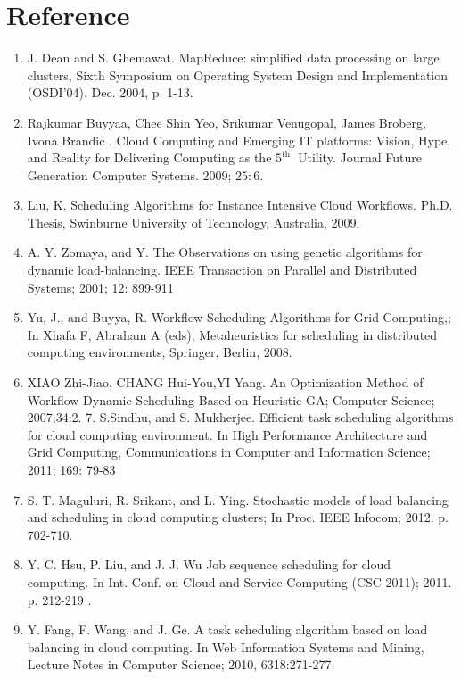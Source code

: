 \documentclass[10pt]{article}
\begin{document}
\section{Reference}
\begin{enumerate}
  \item J. Dean and S. Ghemawat. MapReduce: simplified data processing on large clusters, Sixth Symposium on Operating System Design and Implementation (OSDI'04). Dec. 2004, p. 1-13.

  \item Rajkumar Buyyaa, Chee Shin Yeo, Srikumar Venugopal, James Broberg, Ivona Brandic . Cloud Computing and Emerging IT platforms: Vision, Hype, and Reality for Delivering Computing as the $5^{\text {th }}$ Utility. Journal Future Generation Computer Systems. 2009; $25: 6$.

  \item Liu, K. Scheduling Algorithms for Instance Intensive Cloud Workflows. Ph.D. Thesis, Swinburne University of Technology, Australia, 2009.

  \item A. Y. Zomaya, and Y. The Observations on using genetic algorithms for dynamic load-balancing. IEEE Transaction on Parallel and Distributed Systems; 2001; 12: 899-911

  \item Yu, J., and Buyya, R. Workflow Scheduling Algorithms for Grid Computing,; In Xhafa F, Abraham A (eds), Metaheuristics for scheduling in distributed computing environments, Springer, Berlin, 2008.

  \item XIAO Zhi-Jiao, CHANG Hui-You,YI Yang. An Optimization Method of Workflow Dynamic Scheduling Based on Heuristic GA; Computer Science; 2007;34:2. 7. S.Sindhu, and S. Mukherjee. Efficient task scheduling algorithms for cloud computing environment. In High Performance Architecture and Grid Computing, Communications in Computer and Information Science; 2011; 169: 79-83

  \item S. T. Maguluri, R. Srikant, and L. Ying. Stochastic models of load balancing and scheduling in cloud computing clusters; In Proc. IEEE Infocom; 2012. p. 702-710.

  \item Y. C. Hsu, P. Liu, and J. J. Wu Job sequence scheduling for cloud computing. In Int. Conf. on Cloud and Service Computing (CSC 2011); 2011. p. 212-219 .

  \item Y. Fang, F. Wang, and J. Ge. A task scheduling algorithm based on load balancing in cloud computing. In Web Information Systems and Mining, Lecture Notes in Computer Science; 2010, 6318:271-277.

\end{enumerate}
\end{document}
